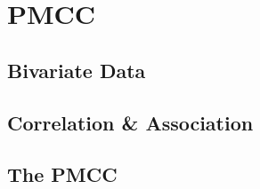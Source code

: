 \documentclass[../maths.tex]{subfiles}
\begin{document}
\chapter{PMCC}
\section{Bivariate Data}
\section{Correlation \& Association}
\section{The PMCC}
\end{document}
